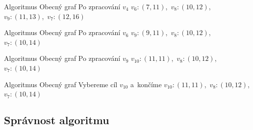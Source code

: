 \documentclass[11pt,professionalfont,aspectratio=43]{beamer}
\begin{document}
    \begin{frame}{Algoritmus \Astar}{Obecný graf}
    \centering
    \AStarGraphState
        {Po zpracování $v_4$}
        {$v_6:(7,11)$,\ $v_8:(10,12)$,\\[0.5mm]
        $v_9:(11,13)$,\ $v_7:(12,16)$}
        {\AStarGraphTreeF}
        {\AStarGraphNodesF}
    \end{frame}

    \begin{frame}{Algoritmus \Astar}{Obecný graf}
    \centering
    \AStarGraphState
        {Po zpracování $v_6$}
        {$v_9:(9,11)$,\ $v_8:(10,12)$,\\[0.5mm]
        $v_7:(10,14)$}
        {\AStarGraphTreeG}
        {\AStarGraphNodesG}
    \end{frame}

    \begin{frame}{Algoritmus \Astar}{Obecný graf}
    \centering
    \AStarGraphState
        {Po zpracování $v_9$}
        {$v_{10}:(11,11)$,\ $v_8:(10,12)$,\\[0.5mm]
        $v_7:(10,14)$}
        {\AStarGraphTreeH}
        {\AStarGraphNodesH}
    \end{frame}

    \begin{frame}{Algoritmus \Astar}{Obecný graf}
    \centering
    \AStarGraphState
        {Vybereme cíl $v_{10}$ a~končíme}
        {$v_{10}:(11,11)$,\ $v_8:(10,12)$,\\[0.5mm]
        $v_7:(10,14)$}
        {\AStarGraphTreeI}
        {\AStarGraphNodesI}
    \end{frame}

    \subsection{Správnost algoritmu \Astar}
\end{document}
